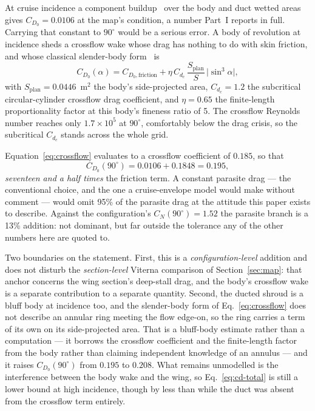 \documentclass[submit]{aiaa-tc}
\begin{document}
At cruise incidence a component
buildup~\cite{raymer2018,hoerner1965fluiddynamicdrag} over the body and
duct wetted areas gives $C_{D_0} = 0.0106$ at the map's condition, a
number Part~I reports in full. Carrying that constant to $90^\circ$
would be a serious error. A body of revolution at incidence sheds a
crossflow wake whose drag has nothing to do with skin friction, and
whose classical slender-body
form~\cite{allenPerkins1951,jorgensen1977} is
\begin{equation}
  C_{D_0}(\alpha) = C_{D_0,\mathrm{friction}}
    + \eta\, C_{d_c}\, \frac{S_{\mathrm{plan}}}{S}\, \lvert\sin^3\alpha\rvert ,
  \label{eq:crossflow}
\end{equation}
with $S_{\mathrm{plan}} = 0.0446$~m$^2$ the body's side-projected area,
$C_{d_c} = 1.2$ the subcritical circular-cylinder crossflow drag
coefficient, and $\eta = 0.65$ the finite-length proportionality factor
at this body's fineness ratio of 5. The crossflow Reynolds number reaches
only $1.7 \times 10^5$ at $90^\circ$, comfortably below the drag crisis,
so the subcritical $C_{d_c}$ stands across the whole grid.

Equation~\eqref{eq:crossflow} evaluates to a crossflow coefficient of
$0.185$, so that
\begin{equation}
  C_{D_0}(90^\circ) = 0.0106 + 0.1848 = 0.195,
\end{equation}
\emph{seventeen and a half times} the friction term. A constant parasite
drag --- the conventional choice, and the one a cruise-envelope model
would make without comment --- would omit 95\% of the parasite drag at
the attitude this paper exists to describe. Against the configuration's
$C_N(90^\circ) = 1.52$ the parasite branch is a 13\% addition: not
dominant, but far outside the tolerance any of the other numbers here
are quoted to.

Two boundaries on the statement. First, this is a
\emph{configuration-level} addition and does not disturb the
\emph{section-level} Viterna comparison of
Section~\ref{sec:map}: that anchor concerns the wing section's deep-stall
drag, and the body's crossflow wake is a separate contribution to a
separate quantity. Second, the ducted shroud is a bluff body at incidence
too, and the slender-body form of Eq.~\eqref{eq:crossflow} does not
describe an annular ring meeting the flow edge-on, so the ring carries a
term of its own on its side-projected area. That is a bluff-body
estimate rather than a computation --- it borrows the crossflow
coefficient and the finite-length factor from the body rather than
claiming independent knowledge of an annulus --- and it raises
$C_{D_0}(90^\circ)$ from $0.195$ to $0.208$. What remains unmodelled is
the interference between the body wake and the wing, so
Eq.~\eqref{eq:cd-total} is still a lower bound at high incidence, though
by less than while the duct was absent from the crossflow term entirely.
\end{document}
